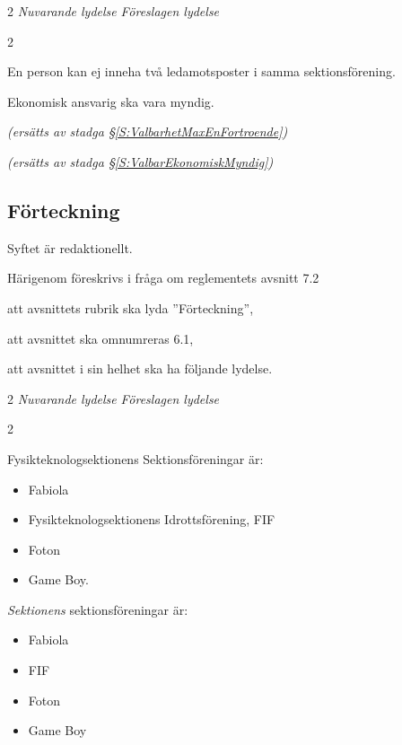 \documentclass{article}
\newenvironment{lydelse}
    {\begin{paracol}{2}%
        \emph{Nuvarande lydelse}%
        \switchcolumn%
        \emph{Föreslagen lydelse}%
    \end{paracol}%
    \begin{enumerate}[label=\thesubsection.\arabic*]%
    \begin{paracol}{2}%
    }{\end{paracol}\end{enumerate}}
\begin{document}
\begin{lydelse}
    \setcounter{section}{7}
    \setcounter{subsection}{1}
    
    \item En person kan ej inneha två ledamotsposter i samma sektionsförening.
	\item Ekonomisk ansvarig ska vara myndig.
	
	\setcounter{section}{6}
    \setcounter{subsection}{0}
    \switchcolumn
    
    \item[] \emph{(ersätts av stadga \S \ref{S:ValbarhetMaxEnFortroende})}\vspace{1.2em}
    \item[] \emph{(ersätts av stadga \S \ref{S:ValbarEkonomiskMyndig})}
    
\end{lydelse}

\subsection{Förteckning}
Syftet är redaktionellt.

Härigenom föreskrivs i fråga om reglementets avsnitt 7.2

\begin{dels}
    \item att avsnittets rubrik ska lyda ''Förteckning'',
    \item att avsnittet ska omnumreras 6.1,
    \item att avsnittet i sin helhet ska ha följande lydelse.
\end{dels}

\begin{lydelse}
    
    \setcounter{section}{7}
    \setcounter{subsection}{2}
    
    \item Fysikteknologsektionens Sektionsföreningar är:
	\begin{itemize}
		\item Fabiola
		\item Fysikteknologsektionens Idrottsförening, FIF
		\item Foton
		\item Game Boy.
	\end{itemize}
	
	\setcounter{section}{6}
    \setcounter{subsection}{1}
    
    \switchcolumn
    
    \item \emph{Sektionens} sektionsföreningar är:
    \begin{itemize}
        \item Fabiola
    	\item FIF
    	\item Foton
    	\item Game Boy
    \end{itemize}
    
\end{lydelse}
\end{document}
